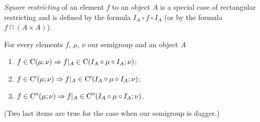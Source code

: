 \emph{Square restricting} of an element
$f$ to an object $A$ is a special case of rectangular restricting
and is defined by the formula $I_{A}\circ f\circ I_{A}$ (or by the
formula $f\sqcap(A\times A)$).
\begin{thm}
\label{rect-cont}For every elements $f$, $\mu$, $\nu$ our semigroup
and an object $A$
\begin{enumerate}
\item \label{contrestr-C}$f\in\mathrm{C}(\mu;\nu)\Rightarrow f|_{A}\in\mathrm{C}(I_{A}\circ\mu\circ I_{A};\nu)$;
\item \label{contrestr-Ci}$f\in\mathrm{C}'(\mu;\nu)\Rightarrow f|_{A}\in\mathrm{C}'(I_{A}\circ\mu\circ I_{A};\nu)$;
\item \label{contrestr-Cii}$f\in\mathrm{C}''(\mu;\nu)\Rightarrow f|_{A}\in\mathrm{C}''(I_{A}\circ\mu\circ I_{A};\nu)$. 
\end{enumerate}

(Two last items are true for the case when our semigroup is dagger.)

\end{thm}
